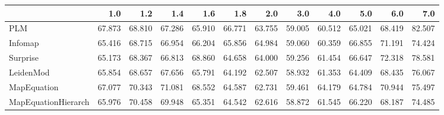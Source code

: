 \begin{tabular}{lrrrrrrrrrrr}
\toprule
{} &    1.0 &    1.2 &    1.4 &    1.6 &    1.8 &    2.0 &    3.0 &    4.0 &    5.0 &    6.0 &    7.0 \\
\midrule
PLM                 & 67.873 & 68.810 & 67.286 & 65.910 & 66.771 & 63.755 & 59.005 & 60.512 & 65.021 & 68.419 & 82.507 \\
Infomap             & 65.416 & 68.715 & 66.954 & 66.204 & 65.856 & 64.984 & 59.060 & 60.359 & 66.855 & 71.191 & 74.424 \\
Surprise            & 65.173 & 68.367 & 66.813 & 68.860 & 64.658 & 64.000 & 59.256 & 61.454 & 66.647 & 72.318 & 78.581 \\
LeidenMod           & 65.854 & 68.657 & 67.656 & 65.791 & 64.192 & 62.507 & 58.932 & 61.353 & 64.409 & 68.435 & 76.067 \\
MapEquation         & 67.077 & 70.343 & 71.081 & 68.552 & 64.587 & 62.731 & 59.461 & 64.179 & 64.784 & 70.944 & 75.497 \\
MapEquationHierarch & 65.976 & 70.458 & 69.948 & 65.351 & 64.542 & 62.616 & 58.872 & 61.545 & 66.220 & 68.187 & 74.485 \\
\bottomrule
\end{tabular}
